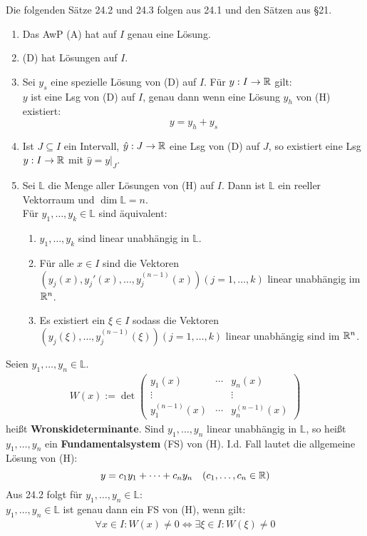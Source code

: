 \documentclass[a4paper,oneside,DIV15,BCOR12mm,chapterprefix=true,headings=onelinechapter]{scrbook}
\begin{document}
Die folgenden Sätze 24.2 und 24.3 folgen aus 24.1 und den Sätzen aus §21.

\begin{satz}
\begin{enumerate}
\item Das AwP (A) hat auf $I$ genau eine Lösung.
\item (D) hat Lösungen auf $I$.
\item Sei $y_s$ eine spezielle Lösung von (D) auf $I$. Für $y:I\to\mathbb{R}$ gilt:\\
$y$ ist eine Lsg von (D) auf $I$, genau dann wenn eine Lösung $y_h$ von (H) existiert:
\[y=y_h+y_s\]
\item Ist $J\subseteq I$ ein Intervall, $\hat y:J\to\mathbb{R}$ eine Lsg von (D) auf $J$,
so existiert eine Lsg $y:I\to\mathbb{R}$ mit $\hat y=y|_J$.
\item Sei $\mathbb{L}$ die Menge aller Lösungen von (H) auf $I$. Dann ist $\mathbb{L}$
ein reeller Vektorraum und $\dim\mathbb{L}=n$.\\
Für $y_1,\ldots,y_k\in\mathbb{L}$ sind äquivalent:
\begin{enumerate}
\item $y_1,\ldots,y_k$ sind linear unabhängig in $\mathbb{L}$.
\item Für alle $x\in I$ sind die Vektoren $(y_j(x),y_j'(x),\ldots,y_j^{(n-1)}(x)) (j=1,\ldots,k)$
linear unabhängig im $\mathbb{R}^n$.
\item Es existiert ein $\xi\in I$ sodass die Vektoren $(y_j(\xi),\ldots,y_j^{(n-1)}(\xi)) (j=1,\ldots,k)$
linear unabhängig sind im $\mathbb{R}^n$.
\end{enumerate}
\end{enumerate}
\end{satz}

\begin{definition}
Seien $y_1,\ldots,y_n\in\mathbb{L}$.
\begin{align*}
W(x):= \det\begin{pmatrix}
y_1(x)&\cdots&y_n(x)\\
\vdots& &\vdots\\
y_1^{(n-1)}(x)&\cdots&y_n^{(n-1)}(x)
\end{pmatrix}
\end{align*}
heißt \textbf{Wronskideterminante}. Sind $y_1,\ldots,y_n$ linear unabhängig in $\mathbb{L}$,
so heißt $y_1,\ldots,y_n$ ein \textbf{Fundamentalsystem} (FS) von (H). I.d. Fall 
lautet die allgemeine Lösung von (H):
\[y=c_1y_1+\cdots+c_ny_n \quad (c_1,\ldots,c_n\in\mathbb{R})\]
Aus 24.2 folgt für $y_1,\ldots,y_n\in\mathbb{L}$:\\
$y_1,\ldots,y_n\in\mathbb{L}$ ist genau dann ein FS von (H), wenn gilt:
\begin{align*}
\forall x\in I: W(x)\ne 0 \iff \exists\xi\in I:W(\xi)\ne 0
\end{align*}
\end{definition}
\end{document}
